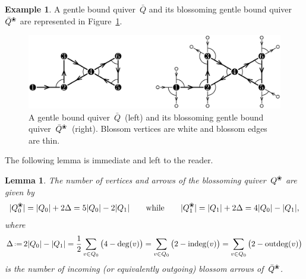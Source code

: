 \documentclass{amsart}
\newtheorem{lemma}[theorem]{Lemma}
\theoremstyle{definition}
\newtheorem{example}[theorem]{Example}
\newcommand{\eqdef}{\mbox{\,\raisebox{0.2ex}{\scriptsize\ensuremath{\mathrm:}}\ensuremath{=}\,}} %
\newcommand{\fref}[1]{Figure~\ref{#1}} %
\newcommand{\blossom}{^\text{\ding{96}}} %
\newcommand{\indeg}{\mathrm{indeg}} %
\newcommand{\outdeg}{\mathrm{outdeg}} %
\begin{document}
\begin{example}
A gentle bound quiver~$\bar Q$ and its blossoming gentle bound quiver~$\bar Q\blossom$ are represented in \fref{fig:exmBlossomingQuiver}.
\vspace*{-.4cm}

\begin{figure}[h]
	\capstart
	\centerline{\includegraphics[scale=.7]{exmBlossomingQuiver}}
	\caption{A gentle bound quiver~$\bar Q$~(left) and its blossoming gentle bound quiver~$\bar Q\blossom$~(right). Blossom vertices are white and blossom edges are thin.}
	\label{fig:exmBlossomingQuiver}
\end{figure}
\end{example}

The following lemma is immediate and left to the reader.

\begin{lemma}
The number of vertices and arrows of the blossoming quiver~$Q\blossom$ are given by
\[
|Q\blossom_0| = |Q_0| + 2\Delta = 5|Q_0|-2|Q_1|
\qquad\text{while}\qquad
|Q\blossom_1| = |Q_1| + 2\Delta = 4|Q_0|-|Q_1|,
\]
where
\[
\Delta \eqdef 2|Q_0| - |Q_1| = \frac{1}{2} \sum_{v \in Q_0} \big( 4-\deg(v) \big) = \sum_{v \in Q_0} \big( 2-\indeg(v) \big) = \sum_{v \in Q_0} \big( 2-\outdeg(v) \big)
\]
is the number of incoming (or equivalently outgoing) blossom arrows of~$\bar Q\blossom$.
\end{lemma}
\end{document}
